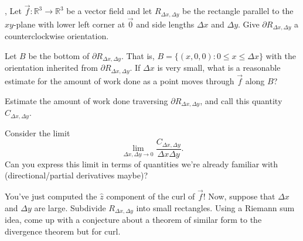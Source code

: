 \documentclass[letter]{article}
\newcommand{\R}{\mathbb{R}}
\renewcommand{\emph}[1]{{\color{defcolor} \textbf{\textit{##1}}}}
\begin{document}
	\sep
	Let $\vec f:\R^3\to\R^3$ be a vector field and let $R_{\Delta x, \Delta y}$ be the 
	rectangle parallel to the $xy$-plane with lower left corner at $\vec 0$ and side lengths
	$\Delta x$ and $\Delta y$.  Give $\partial R_{\Delta x, \Delta y}$ a counterclockwise
	orientation.
	\begin{Enum}
		\item Let $B$ be the bottom of $\partial R_{\Delta x, \Delta y}$.  That is, 
			$B=\{(x,0,0): 0\leq x\leq \Delta x\}$ with the orientation
			inherited from $\partial R_{\Delta x, \Delta y}$.  If $\Delta x$
			is very small, what is a reasonable estimate for the amount of work
			done as a point moves through $\vec f$ along $B$?
		\item Estimate the amount of work done traversing $\partial R_{\Delta x, \Delta y}$,
			and call this quantity $C_{\Delta x, \Delta y}$.
		\item Consider the limit
			\[
				\lim_{\Delta x,\Delta y\to 0} \frac{C_{\Delta x, \Delta y}}{\Delta x \Delta y}.
			\]
			Can you express this limit in terms of quantities we're already familiar with 
			(directional/partial derivatives maybe)?
		\item You've just computed the $\hat z$ component of the curl of $\vec f$!
			Now, suppose that $\Delta x$ and $\Delta y$ are large.  Subdivide $R_{\Delta x, \Delta y}$
			into small rectangles.  Using a Riemann sum idea, come up with a conjecture
			about a theorem of similar form to the divergence theorem but for curl.
	\end{Enum}

	\vspace{-1cm}
\end{document}

